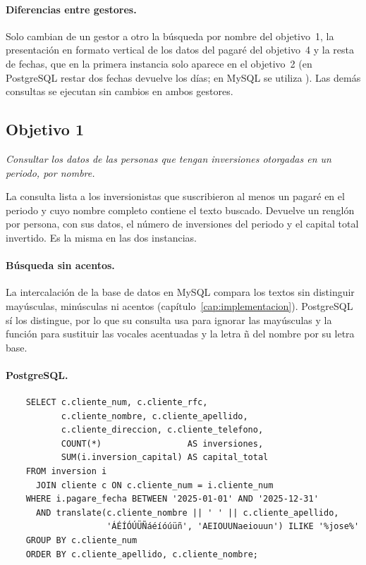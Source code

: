 \paragraph{Diferencias entre gestores.} Solo cambian de un gestor a otro la b\'usqueda por nombre del objetivo~1, la presentaci\'on en formato vertical de los datos del pagar\'e del objetivo~4 y la resta de fechas, que en la primera instancia solo aparece en el objetivo~2 (en PostgreSQL restar dos fechas devuelve los d\'ias; en MySQL se utiliza ). Las dem\'as consultas se ejecutan sin cambios en ambos gestores.

\subsection{Objetivo 1}

\textit{Consultar los datos de las personas que tengan inversiones otorgadas en un periodo, por nombre.}

La consulta lista a los inversionistas que suscribieron al menos un pagar\'e en el periodo y cuyo nombre completo contiene el texto buscado. Devuelve un rengl\'on por persona, con sus datos, el n\'umero de inversiones del periodo y el capital total invertido. Es la misma en las dos instancias.

\paragraph{B\'usqueda sin acentos.} La intercalaci\'on de la base de datos en MySQL compara los textos sin distinguir may\'usculas, min\'usculas ni acentos (cap\'itulo~\ref{cap:implementacion}). PostgreSQL s\'i los distingue, por lo que su consulta usa  para ignorar las may\'usculas y la funci\'on  para sustituir las vocales acentuadas y la letra \~n del nombre por su letra base.

\paragraph{PostgreSQL.}

\begin{verbatim}
	SELECT c.cliente_num, c.cliente_rfc,
	       c.cliente_nombre, c.cliente_apellido,
	       c.cliente_direccion, c.cliente_telefono,
	       COUNT(*)                 AS inversiones,
	       SUM(i.inversion_capital) AS capital_total
	FROM inversion i
	  JOIN cliente c ON c.cliente_num = i.cliente_num
	WHERE i.pagare_fecha BETWEEN '2025-01-01' AND '2025-12-31'
	  AND translate(c.cliente_nombre || ' ' || c.cliente_apellido,
	                'ÁÉÍÓÚÜÑáéíóúüñ', 'AEIOUUNaeiouun') ILIKE '%jose%'
	GROUP BY c.cliente_num
	ORDER BY c.cliente_apellido, c.cliente_nombre;
\end{verbatim}

